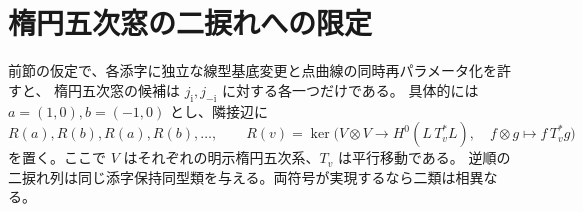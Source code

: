 \section{楕円五次窓の二捩れへの限定}
\label{sec:elliptic-quintic-cubic-overlaps}
\begin{theorem}\label{thm:elliptic-quintic-torsion}
前節の仮定で、各添字に独立な線型基底変更と点曲線の同時再パラメータ化を許すと、
楕円五次窓の候補は $j_{\mathrm i},j_{-\mathrm i}$ に対する各一つだけである。
具体的には $a=(1,0), b=(-1,0)$ とし、隣接辺に
\[
 R(a),R(b),R(a),R(b),\ldots,\qquad
 R(v)=\ker\bigl(V\otimes V\to H^0(L\,T_v^*L),\quad f\otimes g\mapsto f\,T_v^*g\bigr)
\]
を置く。ここで $V$ はそれぞれの明示楕円五次系、$T_v$ は平行移動である。
逆順の二捩れ列は同じ添字保持同型類を与える。両符号が実現するなら二類は相異なる。
\end{theorem}
